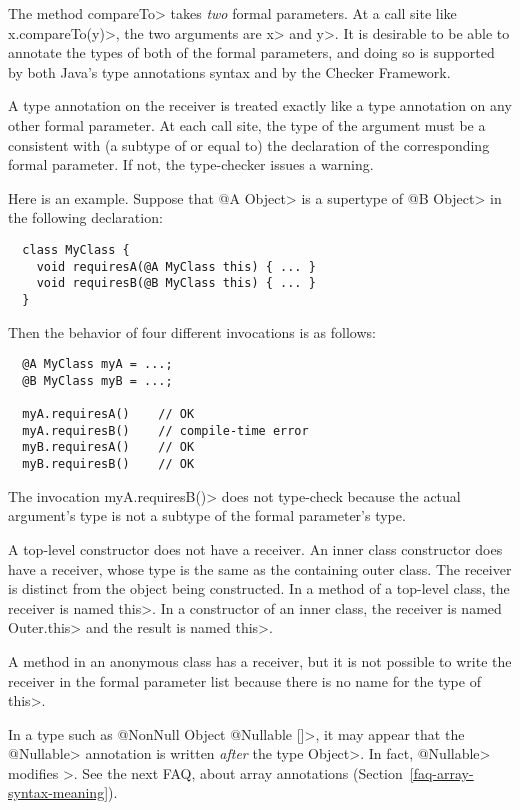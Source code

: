 The method \<compareTo> takes \emph{two} formal parameters.  At a call site
like \<x.compareTo(y)>, the two arguments are \<x> and \<y>.  It is
desirable to be able to annotate the types of both of the formal
parameters, and doing so is supported by both Java's type annotations
syntax and by the Checker Framework.

A type annotation on the receiver is treated exactly like a type annotation
on any other formal parameter.  At each call site, the type of the argument
must be a consistent with (a subtype of or equal to) the declaration of the
corresponding formal parameter.  If not, the type-checker issues a warning.

Here is an example.  Suppose that \<@A Object> is a supertype of \<@B
Object> in the following declaration:

\begin{Verbatim}
  class MyClass {
    void requiresA(@A MyClass this) { ... }
    void requiresB(@B MyClass this) { ... }
  }
\end{Verbatim}

\noindent
Then the behavior of four different invocations is as follows:

\begin{Verbatim}
  @A MyClass myA = ...;
  @B MyClass myB = ...;

  myA.requiresA()    // OK
  myA.requiresB()    // compile-time error
  myB.requiresA()    // OK
  myB.requiresB()    // OK
\end{Verbatim}

The invocation \<myA.requiresB()> does not type-check because the actual
argument's type is not a subtype of the formal parameter's type.

A top-level constructor does not have a receiver.  An inner class
constructor does have a receiver, whose type is the same as the containing
outer class.  The receiver is distinct from the object being constructed.
In a method of a top-level class, the receiver is named \<this>.  In a
constructor of an inner class, the receiver is named \<Outer.this> and the
result is named \<this>.

A method in an anonymous class has a receiver, but it is not possible to
write the receiver in the formal parameter list because there is no name
for the type of \<this>.



In a type such as \<@NonNull Object @Nullable []>, it may appear that the
\<@Nullable> annotation is written \emph{after} the type \<Object>.  In
fact, \<@Nullable> modifies \<[]>.  See the next FAQ, about array
annotations (Section~\ref{faq-array-syntax-meaning}).


